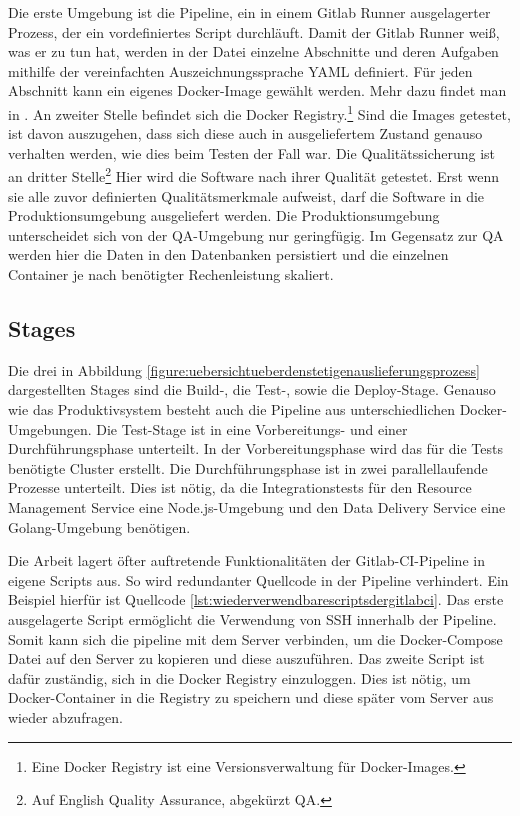 Die erste Umgebung ist die Pipeline, ein in einem
Gitlab Runner ausgelagerter Prozess, der ein vordefiniertes Script durchläuft.
Damit der Gitlab Runner weiß, was er zu tun hat, werden in der 
Datei einzelne Abschnitte und deren Aufgaben mithilfe der vereinfachten
Auszeichnungssprache YAML definiert. Für jeden Abschnitt kann ein eigenes Docker-Image
gewählt werden. Mehr dazu findet man in . An zweiter Stelle
befindet sich die Docker Registry.\footnote{Eine Docker Registry ist eine Versionsverwaltung für Docker-Images.}
Sind die Images getestet, ist davon auszugehen, dass sich diese auch
in ausgeliefertem Zustand genauso verhalten werden, wie dies beim Testen
der Fall war. Die Qualitätssicherung ist an dritter Stelle\footnote{Auf English Quality Assurance, abgekürzt QA.}
Hier wird die Software nach ihrer Qualität getestet. Erst wenn sie alle
zuvor definierten Qualitätsmerkmale aufweist, darf die Software in die Produktionsumgebung
ausgeliefert werden. Die Produktionsumgebung unterscheidet sich von der QA-Umgebung
nur geringfügig. Im Gegensatz zur QA werden hier die Daten in den Datenbanken persistiert und die
einzelnen Container je nach benötigter Rechenleistung skaliert.

\subsection{Stages}
\label{subsec:stages}
Die drei in Abbildung \ref{figure:uebersichtueberdenstetigenauslieferungsprozess} dargestellten Stages sind
die \mbox{Build-,} die \mbox{Test-,} sowie die Deploy-Stage. Genauso wie das Produktivsystem
besteht auch die Pipeline aus unterschiedlichen Docker-Umgebungen. Die Test-Stage ist in eine Vorbereitungs-
und einer Durchführungsphase unterteilt. In der Vorbereitungsphase wird das für die Tests
benötigte Cluster erstellt. Die Durchführungsphase ist in zwei parallellaufende Prozesse
unterteilt. Dies ist nötig, da die Integrationstests für den Resource Management Service
eine Node.js-Umgebung und den Data Delivery Service eine Golang-Umgebung benötigen.

Die Arbeit lagert öfter auftretende Funktionalitäten der Gitlab-CI-Pipeline in eigene Scripts aus.
So wird redundanter Quellcode in der Pipeline verhindert. Ein Beispiel hierfür
ist Quellcode \ref{lst:wiederverwendbarescriptsdergitlabci}. Das erste ausgelagerte
Script ermöglicht die Verwendung von SSH innerhalb der Pipeline. Somit kann sich
die pipeline mit dem Server verbinden, um die Docker-Compose Datei auf den Server
zu kopieren und diese auszuführen. Das zweite Script ist dafür zuständig,
sich in die Docker Registry einzuloggen. Dies ist nötig, um Docker-Container
in die Registry zu speichern und diese später vom Server aus wieder abzufragen.

